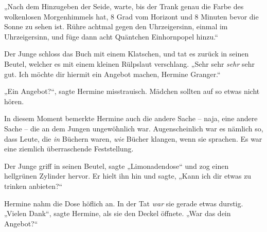„Nach dem Hinzugeben der Seide, warte, bis der Trank genau die Farbe des wolkenlosen Morgenhimmels hat, 8 Grad vom Horizont und 8 Minuten bevor die Sonne zu sehen ist. Rühre achtmal gegen den Uhrzeigersinn, einmal im Uhrzeigersinn, und füge dann acht Quäntchen Einhornpopel hinzu.“

Der Junge schloss das Buch mit einem Klatschen, und tat es zurück in seinen Beutel, welcher es mit einem kleinen Rülpslaut verschlang. „Sehr sehr \emph{sehr} sehr gut. Ich möchte dir hiermit ein Angebot machen, Hermine Granger.“

„Ein Angebot?“, sagte Hermine misstrauisch. Mädchen sollten auf so etwas nicht hören.

In diesem Moment bemerkte Hermine auch die andere Sache – naja, eine andere Sache – die an dem Jungen ungewöhnlich war. Augenscheinlich war es nämlich so, dass Leute, die \emph{in} Büchern waren, \emph{wie} Bücher klangen, wenn sie sprachen. Es war eine ziemlich überraschende Feststellung.

Der Junge griff in seinen Beutel, sagte „Limonadendose“ und zog einen hellgrünen Zylinder hervor. Er hielt ihn hin und sagte, „Kann ich dir etwas zu trinken anbieten?“

Hermine nahm die Dose höflich an. In der Tat \emph{war} sie gerade etwas durstig. „Vielen Dank“, sagte Hermine, als sie den Deckel öffnete. „War das dein Angebot?“

